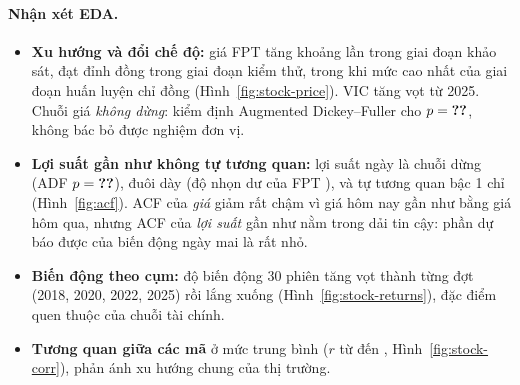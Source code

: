 \paragraph{Nhận xét EDA.}
\begin{itemize}
  \item \textbf{Xu hướng và đổi chế độ:} giá FPT tăng khoảng  lần trong giai đoạn khảo sát, đạt đỉnh
     đồng trong giai đoạn kiểm thử, trong khi mức cao nhất của giai đoạn huấn luyện chỉ
     đồng (Hình~\ref{fig:stock-price}). VIC tăng vọt từ 2025. Chuỗi giá \emph{không dừng}:
    kiểm định Augmented Dickey--Fuller cho $p = \SL{eda/stock/adf_price_p}$, không bác bỏ được nghiệm đơn vị.
  \item \textbf{Lợi suất gần như không tự tương quan:} lợi suất ngày là chuỗi dừng (ADF $p = \SL{eda/stock/adf_ret_p}$),
    đuôi dày (độ nhọn dư của FPT ), và tự tương quan bậc 1 chỉ 
    (Hình~\ref{fig:acf}). ACF của \emph{giá} giảm rất chậm vì giá hôm nay gần như bằng giá hôm qua, nhưng ACF của
    \emph{lợi suất} gần như nằm trong dải tin cậy: phần dự báo được của biến động ngày mai là rất nhỏ.
  \item \textbf{Biến động theo cụm:} độ biến động 30 phiên tăng vọt thành từng đợt (2018, 2020, 2022, 2025) rồi lắng xuống
    (Hình~\ref{fig:stock-returns}), đặc điểm quen thuộc của chuỗi tài chính.
  \item \textbf{Tương quan giữa các mã} ở mức trung bình ($r$ từ  đến ,
    Hình~\ref{fig:stock-corr}), phản ánh xu hướng chung của thị trường.
\end{itemize}


